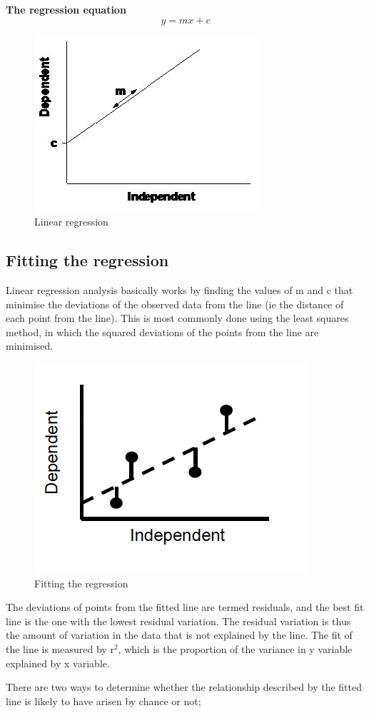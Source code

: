 \documentclass[
]{book}
\begin{document}
\textbf{The regression equation}
\[
y=mx+c
\]

\begin{figure}
\includegraphics[width=0.4\linewidth]{figures/regression} \caption{Linear regression}\label{fig:unnamed-chunk-56}
\end{figure}

\subsection*{Fitting the regression}\label{fitting-the-regression}

Linear regression analysis basically works by finding the values of m and c that minimise the deviations of the observed data from the line (ie the distance of each point from the line). This is most commonly done using the least squares method, in which the squared deviations of the points from the line are minimised.

\begin{figure}
\includegraphics[width=0.4\linewidth]{figures/residuals} \caption{Fitting the regression}\label{fig:unnamed-chunk-57}
\end{figure}

The deviations of points from the fitted line are termed residuals, and the best fit line is the one with the lowest residual variation. The residual variation is thus the amount of variation in the data that is not explained by the line. The fit of the line is measured by r\(^2\), which is the proportion of the variance in y variable explained by x variable.

There are two ways to determine whether the relationship described by the fitted line is likely to have arisen by chance or not;
\end{document}
